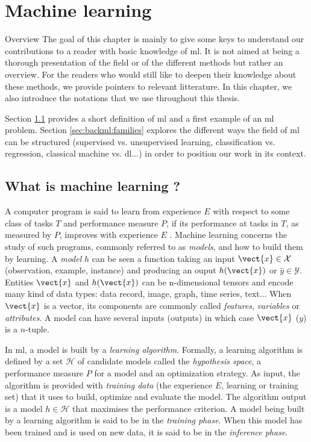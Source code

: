 \chapter{Machine learning}
\label{chap:backml}

\begin{overview}{Overview}
The goal of this chapter is mainly to give some keys to understand our contributions to a reader with basic knowledge of \acrlong{ml}. It is not aimed at being a thorough presentation of the field or of the different methods but rather an overview. For the readers who would still like to deepen their knowledge about these methods, we provide pointers to relevant litterature. In this chapter, we also introduce the notations that we use throughout this thesis. 
 
Section \ref{sec:backml:whatisml} provides a short definition of \acrlong{ml} and a first example of an \acrshort{ml} problem. Section \ref{sec:backml:families} explores the different ways the field of \acrlong{ml} can be structured (\eg supervised vs. unsupervised learning, classification vs. regression, classical machine vs. \acrlong{dl}...) in order to position our work in its context.   
\end{overview}

\section{What is machine learning ?} 
\label{sec:backml:whatisml}

A computer program is said to learn from experience $E$ with respect to some class of tasks $T$ and performance measure $P$, if its performance at tasks in $T$, as measured by $P$, improves with experience $E$ \parencite{mitchell1997machine}. Machine learning concerns the study of such programs, commonly referred to as \textit{models}, and how to build them by learning. A \textit{model} $h$ can be seen a function taking an input $\vect{x} \in \mathcal{X}$ (\aka observation, example, instance) and producing an ouput $h(\vect{x})$ or $\hat{y} \in \mathcal{Y}$. Entities $\vect{x}$ and $h(\vect{x})$ can be  n-dimensional tensors and encode many kind of data types: data record, image, graph, time series, text... When $\vect{x}$ is a vector, its components are commonly called \textit{features}, \textit{variables} or \textit{attributes}. A model can have several inputs (\resp outputs) in which case $\vect{x}$ (\resp $y$) is a $n$-tuple.

In \acrlong{ml}, a model is built by a \textit{learning algorithm}. Formally, a learning algorithm is defined by a set $\mathcal{H}$ of candidate models called the \textit{hypothesis space}, a performance measure $P$ for a model and an optimization strategy. As input, the algorithm is provided with \textit{training data} (the experience $E$, \aka learning or training set) that it uses to build, optimize and evaluate the model. The algorithm output is a model $h \in \mathcal{H}$ that maximises the performance criterion. A model being built by a learning algorithm is said to be in the \textit{training phase}. When this model has been trained and is used on new data, it is said to be in the \textit{inference phase}.  

